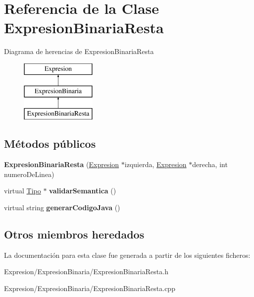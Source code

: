 \hypertarget{class_expresion_binaria_resta}{\section{Referencia de la Clase Expresion\-Binaria\-Resta}
\label{class_expresion_binaria_resta}
}
Diagrama de herencias de Expresion\-Binaria\-Resta\begin{figure}[H]
\begin{center}
\leavevmode
\includegraphics[height=3.000000cm]{class_expresion_binaria_resta}
\end{center}
\end{figure}
\subsection*{Métodos públicos}
\begin{DoxyCompactItemize}
\item 
\hypertarget{class_expresion_binaria_resta_a9b0be23838ca6ad1a4a5f7b937bebec3}{{\bfseries Expresion\-Binaria\-Resta} (\hyperlink{class_expresion}{Expresion} $\ast$izquierda, \hyperlink{class_expresion}{Expresion} $\ast$derecha, int numero\-De\-Linea)}\label{class_expresion_binaria_resta_a9b0be23838ca6ad1a4a5f7b937bebec3}

\item 
\hypertarget{class_expresion_binaria_resta_a726f776a505f953d71a9b0abebd09382}{virtual \hyperlink{class_tipo}{Tipo} $\ast$ {\bfseries validar\-Semantica} ()}\label{class_expresion_binaria_resta_a726f776a505f953d71a9b0abebd09382}

\item 
\hypertarget{class_expresion_binaria_resta_a0ff7e1880ebe673dd73230085633ae57}{virtual string {\bfseries generar\-Codigo\-Java} ()}\label{class_expresion_binaria_resta_a0ff7e1880ebe673dd73230085633ae57}

\end{DoxyCompactItemize}
\subsection*{Otros miembros heredados}


La documentación para esta clase fue generada a partir de los siguientes ficheros\-:\begin{DoxyCompactItemize}
\item 
Expresion/\-Expresion\-Binaria/Expresion\-Binaria\-Resta.\-h\item 
Expresion/\-Expresion\-Binaria/Expresion\-Binaria\-Resta.\-cpp\end{DoxyCompactItemize}
